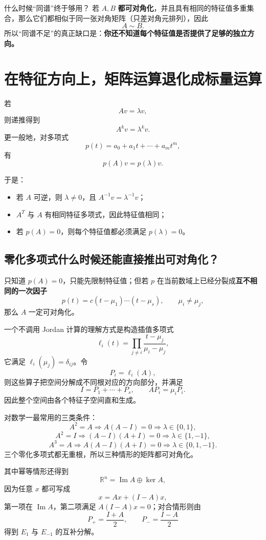 \documentclass[11pt,a4paper]{ctexart}
\newcommand{\kw}[1]{\textbf{\color{deep}#1}}
\begin{document}
\begin{corebox}{什么时候“同谱”终于够用？}
若 $A,B$ \kw{都可对角化}，并且具有相同的特征值多重集合，那么它们都相似于同一张对角矩阵（只差对角元排列），因此
\[
\boxed{A\sim B.}
\]
所以“同谱不足”的真正缺口是：\kw{你还不知道每个特征值是否提供了足够的独立方向。}
\end{corebox}

\section{在特征方向上，矩阵运算退化成标量运算}

若
\[
Av=\lambda v,
\]
则递推得到
\[
A^kv=\lambda^k v.
\]
更一般地，对多项式
\[
p(t)=a_0+a_1t+\cdots+a_mt^m,
\]
有
\[
\boxed{p(A)v=p(\lambda)v.}
\]

于是：
\begin{itemize}
  \item 若 $A$ 可逆，则 $\lambda\neq0$，且 $A^{-1}v=\lambda^{-1}v$；
  \item $A^T$ 与 $A$ 有相同特征多项式，因此特征值相同；
  \item 若 $p(A)=0$，则每个特征值都必须满足 $p(\lambda)=0$。
\end{itemize}

\subsection{零化多项式什么时候还能直接推出可对角化？}

只知道 $p(A)=0$，只能先限制特征值；但若 $p$ 在当前数域上已经分裂成\kw{互不相同的一次因子}
\[
p(t)=c(t-\mu_1)\cdots(t-\mu_s),
\qquad \mu_i\neq\mu_j,
\]
那么 $A$ 一定可对角化。

一个不调用 Jordan 计算的理解方式是构造插值多项式
\[
\ell_i(t)=\prod_{j\neq i}\frac{t-\mu_j}{\mu_i-\mu_j},
\]
它满足 $\ell_i(\mu_j)=\delta_{ij}$。令
\[
P_i=\ell_i(A),
\]
则这些算子把空间分解成不同根对应的方向部分，并满足
\[
I=P_1+\cdots+P_s,
\qquad
AP_i=\mu_iP_i.
\]
因此整个空间由各个特征子空间直和生成。

对数学一最常用的三类条件：
\[
A^2=A
\Rightarrow
A(A-I)=0
\Rightarrow
\lambda\in\{0,1\},
\]
\[
A^2=I
\Rightarrow
(A-I)(A+I)=0
\Rightarrow
\lambda\in\{1,-1\},
\]
\[
A^3=A
\Rightarrow
A(A-I)(A+I)=0
\Rightarrow
\lambda\in\{0,1,-1\}.
\]
三个零化多项式都无重根，所以三种情形的矩阵都可对角化。

其中幂等情形还得到
\[
\boxed{\mathbb R^n=\operatorname{Im}A\oplus\ker A,}
\]
因为任意 $x$ 都可写成
\[
x=Ax+(I-A)x,
\]
第一项在 $\operatorname{Im}A$，第二项满足 $A(I-A)x=0$；对合情形则由
\[
P_+=\frac{I+A}{2},
\qquad
P_-=\frac{I-A}{2}
\]
得到 $E_1$ 与 $E_{-1}$ 的互补分解。
\end{document}
